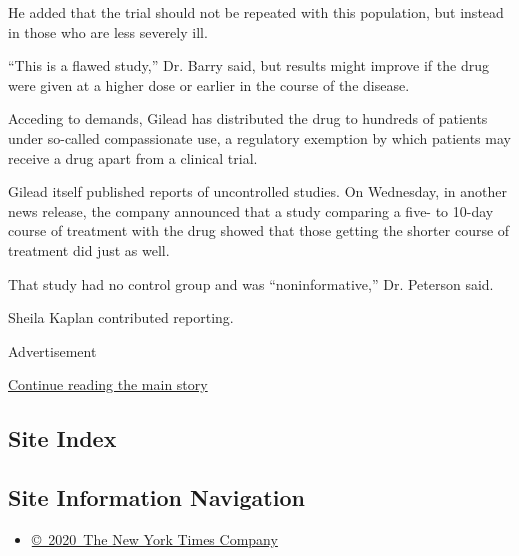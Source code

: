 He added that the trial should not be repeated with this population, but
instead in those who are less severely ill.

``This is a flawed study,'' Dr. Barry said, but results might improve if
the drug were given at a higher dose or earlier in the course of the
disease.

Acceding to demands, Gilead has distributed the drug to hundreds of
patients under so-called compassionate use, a regulatory exemption by
which patients may receive a drug apart from a clinical trial.

Gilead itself published reports of uncontrolled studies. On Wednesday,
in another news release, the company announced that a study comparing a
five- to 10-day course of treatment with the drug showed that those
getting the shorter course of treatment did just as well.

That study had no control group and was ``noninformative,'' Dr. Peterson
said.

Sheila Kaplan contributed reporting.

Advertisement

\protect\hyperlink{after-bottom}{Continue reading the main story}

\hypertarget{site-index}{%
\subsection{Site Index}\label{site-index}}

\hypertarget{site-information-navigation}{%
\subsection{Site Information
Navigation}\label{site-information-navigation}}

\begin{itemize}
\tightlist
\item
  \href{https://help.nytimes3xbfgragh.onion/hc/en-us/articles/115014792127-Copyright-notice}{©~2020~The
  New York Times Company}
\end{itemize}

